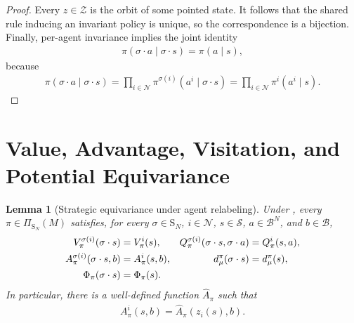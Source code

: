 \documentclass{article}
\theoremstyle{plain}
\newtheorem{lemma}[theorem]{Lemma}
\theoremstyle{definition}
\theoremstyle{remark}
\newcommand{\N}{\mathcal{N}}
\newcommand{\St}{\mathcal{S}}
\newcommand{\Sym}{\mathrm{S}}
\begin{document}
\begin{proof}
Every $z\in\mathcal Z$ is the orbit of some pointed state. It follows that
the shared rule inducing an invariant policy is unique, so the correspondence is
a bijection. Finally, per-agent invariance implies the joint identity
\begin{align}
  \pi(\sigma\mathbin{\cdot}a\mid\sigma\mathbin{\cdot}s)
  =
  \pi(a\mid s),
  \label{eq:perm-joint-policy-invariance}
\end{align}
because
\begin{align*}
  \pi(\sigma\mathbin{\cdot}a\mid\sigma\mathbin{\cdot}s)
  =
  \prod_{i\in\N}
  \pi^{\sigma(i)}(a^i\mid\sigma\mathbin{\cdot}s)
  =
  \prod_{i\in\N}\pi^i(a^i\mid s).
\end{align*}
\end{proof}

\section{Value, Advantage, Visitation, and Potential Equivariance}
\label{app:proof-perm-equivariance}

\begin{lemma}[Strategic equivariance under agent relabeling]
\label{lemma:perm-equivariance}
Under , every
$\pi\in\Pi_{\Sym_N}(M)$ satisfies, for every
$\sigma\in\Sym_N$, $i\in\N$, $s\in\St$, $a\in\mathcal B^N$, and
$b\in\mathcal B$,
\begin{align}
  V^{\sigma(i)}_\pi(\sigma\mathbin{\cdot}s)
  &=
  V^i_\pi(s),&
  Q^{\sigma(i)}_\pi(\sigma\mathbin{\cdot}s,
    \sigma\mathbin{\cdot}a)
  &=
  Q^i_\pi(s,a),
  \label{eq:perm-value-equivariance}\\
  A^{\sigma(i)}_\pi(\sigma\mathbin{\cdot}s,b)
  &=
  A^i_\pi(s,b),&
  d^\pi_\mu(\sigma\mathbin{\cdot}s)
  &=
  d^\pi_\mu(s),
  \notag\\
  \Phi_\pi(\sigma\mathbin{\cdot}s)
  &=
  \Phi_\pi(s).
  \notag
\end{align}
In particular, there is a well-defined function $\widehat A_\pi$ such that
\begin{align}
  A^i_\pi(s,b)
  =
  \widehat A_\pi(z_i(s),b).
  \label{eq:descriptor-advantage}
\end{align}
\end{lemma}
\end{document}
